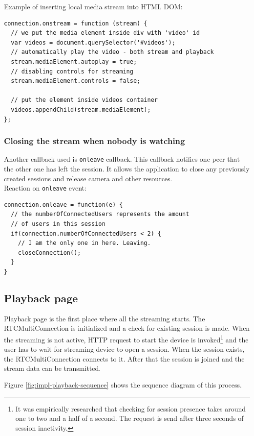 \noindent
Example of inserting local media stream into HTML DOM:
\begin{lstlisting}
connection.onstream = function (stream) {
  // we put the media element inside div with 'video' id
  var videos = document.querySelector('#videos');
  // automatically play the video - both stream and playback
  stream.mediaElement.autoplay = true;
  // disabling controls for streaming
  stream.mediaElement.controls = false;
  
  // put the element inside videos container
  videos.appendChild(stream.mediaElement);
};
\end{lstlisting}


\subsubsection{Closing the stream when nobody is watching}
Another callback used is \verb!onleave! callback. This callback notifies one peer that the other one has left the session. It allows the application to close any previously created sessions and release camera and other resources. \\

\noindent
Reaction on \verb!onleave! event:
\begin{lstlisting}
connection.onleave = function(e) {
  // the numberOfConnectedUsers represents the amount
  // of users in this session
  if(connection.numberOfConnectedUsers < 2) {
    // I am the only one in here. Leaving.
    closeConnection();
  }
}
\end{lstlisting}



\subsection{Playback page}
Playback page is the first place where all the streaming starts. The RTCMultiConnection is initialized and a check for existing session is made. When the streaming is not active, HTTP request to start the device is invoked\footnote{It was empirically researched that checking for session presence takes around one to two and a half of a second. The request is send after three seconds of session inactivity.} and the user has to wait for streaming device to open a session. When the session exists, the RTCMultiConnection connects to it. After that the session is joined and the stream data can be transmitted.

Figure \ref{fig:impl-playback-sequence} shows the sequence diagram of this process.

